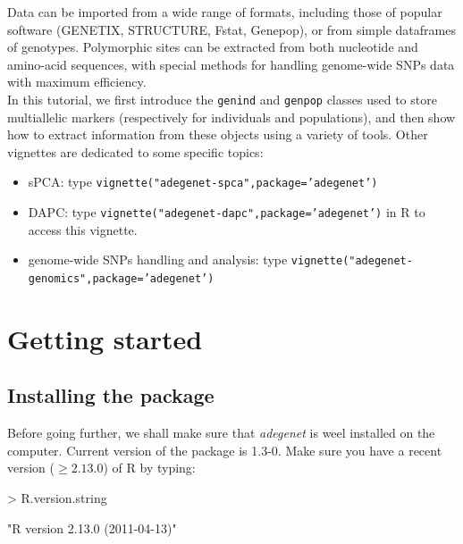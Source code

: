 \documentclass{article}
\begin{document}
Data can be imported from a wide range of formats, including those of
popular software (GENETIX, STRUCTURE, Fstat, Genepop), or from simple dataframes of genotypes.
Polymorphic sites can be extracted from both nucleotide and amino-acid sequences, with special
methods for handling genome-wide SNPs data with maximum efficiency.
\\

In this tutorial, we first introduce the \texttt{genind} and \texttt{genpop} classes used to store
multiallelic markers (respectively for individuals and populations), and then show how to extract
information from these objects using a variety of tools.  Other vignettes are dedicated to some
specific topics:
\begin{itemize}
\item sPCA: type \texttt{vignette("adegenet-spca",package='adegenet')}
\item DAPC: type \texttt{vignette("adegenet-dapc",package='adegenet')} in R to access this vignette.
\item genome-wide SNPs handling and analysis: type \texttt{vignette("adegenet-genomics",package='adegenet')}
\end{itemize}




\newpage
\section{Getting started}


\subsection{Installing the package}
Before going further, we shall make sure that \textit{adegenet} is weel installed
on the computer.
Current version of the package is 1.3-0.
Make sure you have a recent version ($\geq 2.13.0$) of R by typing:
\begin{Schunk}
\begin{Sinput}
> R.version.string
\end{Sinput}
\begin{Soutput}
[1] "R version 2.13.0 (2011-04-13)"
\end{Soutput}
\end{Schunk}
\end{document}
